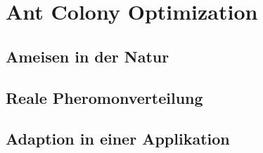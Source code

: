 \section{Ant Colony Optimization}

\subsection{Ameisen in der Natur}

\subsection{Reale Pheromonverteilung}

\subsection{Adaption in einer Applikation}